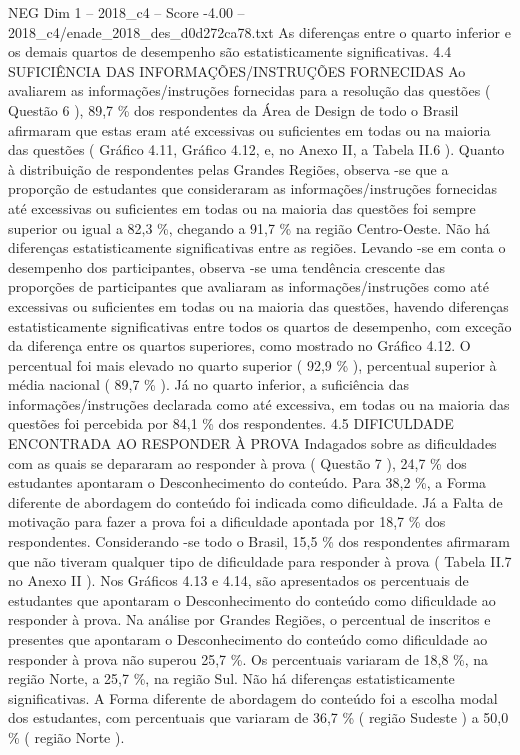 \begin{textsample}{NEG Dim 1 – 2018\_c4 – Score -4.00 – 2018\_c4/enade\_2018\_des\_d0d272ca78.txt}
As diferenças entre o quarto inferior e os demais quartos de desempenho são estatisticamente significativas. 4.4 SUFICIÊNCIA DAS INFORMAÇÕES/INSTRUÇÕES FORNECIDAS Ao avaliarem as informações/instruções fornecidas para a resolução das questões ( Questão 6 ), 89,7 \% dos respondentes da Área de Design de todo o Brasil afirmaram que estas eram até excessivas ou suficientes em todas ou na maioria das questões ( Gráfico 4.11, Gráfico 4.12, e, no Anexo II, a Tabela II.6 ).
Quanto à distribuição de respondentes pelas Grandes Regiões, observa -se que a proporção de estudantes que consideraram as informações/instruções fornecidas até excessivas ou suficientes em todas ou na maioria das questões foi sempre superior ou igual a 82,3 \%, chegando a 91,7 \% na região Centro-Oeste.
Não há diferenças estatisticamente significativas entre as regiões.
Levando -se em conta o desempenho dos participantes, observa -se uma tendência crescente das proporções de participantes que avaliaram as informações/instruções como até excessivas ou suficientes em todas ou na maioria das questões, havendo diferenças estatisticamente significativas entre todos os quartos de desempenho, com exceção da diferença entre os quartos superiores, como mostrado no Gráfico 4.12.
O percentual foi mais elevado no quarto superior ( 92,9 \% ), percentual superior à média nacional ( 89,7 \% ).
Já no quarto inferior, a suficiência das informações/instruções declarada como até excessiva, em todas ou na maioria das questões foi percebida por 84,1 \% dos respondentes. 4.5 DIFICULDADE ENCONTRADA AO RESPONDER À PROVA Indagados sobre as dificuldades com as quais se depararam ao responder à prova ( Questão 7 ), 24,7 \% dos estudantes apontaram o Desconhecimento do conteúdo.
Para 38,2 \%, a Forma diferente de abordagem do conteúdo foi indicada como dificuldade.
Já a Falta de motivação para fazer a prova foi a dificuldade apontada por 18,7 \% dos respondentes.
Considerando -se todo o Brasil, 15,5 \% dos respondentes afirmaram que não tiveram qualquer tipo de dificuldade para responder à prova ( Tabela II.7 no Anexo II ).
Nos Gráficos 4.13 e 4.14, são apresentados os percentuais de estudantes que apontaram o Desconhecimento do conteúdo como dificuldade ao responder à prova.
Na análise por Grandes Regiões, o percentual de inscritos e presentes que apontaram o Desconhecimento do conteúdo como dificuldade ao responder à prova não superou 25,7 \%.
Os percentuais variaram de 18,8 \%, na região Norte, a 25,7 \%, na região Sul.
Não há diferenças estatisticamente significativas.
A Forma diferente de abordagem do conteúdo foi a escolha modal dos estudantes, com percentuais que variaram de 36,7 \% ( região Sudeste ) a 50,0 \% ( região Norte ).

\end{textsample}
